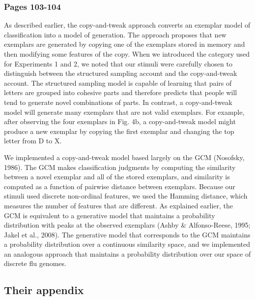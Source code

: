 \documentclass[12pt]{article}
\begin{document}
\subsubsection{Pages 103-104}
\begin{displayquote}
As described earlier, the copy-and-tweak approach converts an exemplar model of classification into a model of generation. The approach proposes that new exemplars are generated by copying one of the exemplars stored in memory and then modifying some features of the copy. When we introduced the category used for Experiments 1 and 2, we noted that our stimuli were carefully chosen to distinguish between the structured sampling account and the copy-and-tweak account. The structured sampling model is capable of learning that pairs of letters are grouped into cohesive parts and therefore predicts that people will tend to generate novel combinations of parts. In contrast, a copy-and-tweak model will generate many exemplars that are not valid exemplars. For example, after observing the four exemplars in Fig. 4b, a copy-and-tweak model might produce a new exemplar by copying the first exemplar and changing the top letter from D to X.

We implemented a copy-and-tweak model based largely on the GCM (Nosofsky, 1986). The GCM makes classification judgments by computing the similarity between a novel exemplar and all of the stored exemplars, and similarity is computed as a function of pairwise distance between exemplars. Because our stimuli used discrete non-ordinal features, we used the Hamming distance, which measures the number of features that are different. As explained earlier, the GCM is equivalent to a generative model that maintains a probability distribution with peaks at the observed exemplars (Ashby \& Alfonso-Reese, 1995; Jakel et al., 2008). The generative model that corresponds to the GCM maintains a probability distribution over a continuous similarity space, and we implemented an analogous approach that maintains a probability distribution over our space of discrete flu genomes.
\end{displayquote}


\subsection{Their appendix}
\end{document}
